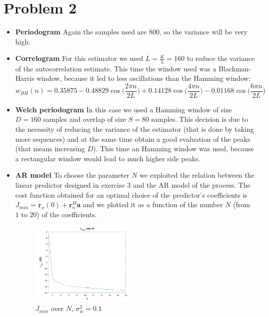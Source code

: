\documentclass[a4paper, 12pt]{report}
\begin{document}
\section*{Problem 2}
\begin{itemize}
	
	\item {\bf Periodogram} Again the samples used are 800, so the variance will be very high.
	
	\item {\bf Correlogram}  For this estimator we used $L=\frac{K}{5}=160$ to reduce the variance of the autocorrelation estimate. This time the window used was a Blackman-Harris window, because it led to less oscillations than the Hamming window:
	\begin{equation}
	w_{BH}(n)=0.35875-0.48829\cos \Big( \frac{2\pi n}{2L} \Big) +0.14128\cos \Big( \frac{4\pi n}{2L} \Big) - 0.01168 \cos \Big( \frac{6 \pi n}{2L} \Big)
	\end{equation}
	
	\item {\bf Welch periodogram} In this case we used a Hamming window of size $D=160$ samples and overlap of size $S=80$ samples. This decision is due to the necessity of reducing the variance of the estimator (that is done by taking more sequences) and at the same time obtain a good evaluation of the peaks (that means increasing $D$). This time an Hamming window was used, because a rectangular window would lead to much higher side peaks. 
	
	
\item {\bf AR model} To choose the parameter $N$ we exploited the relation between the linear predictor designed in exercise 3 and the AR model of the process. The cost function obtained for an optimal choice of the predictor's coefficients is  $J_{min} = \mathtt{r}_x(0) + \mathbf{r}_n^H \mathbf{a}$ and we plotted it as a function of the number $N$ (from $1$ to $20$) of the coefficients.

\begin{figure}[H]
	\centering
	\includegraphics[width=0.5\textwidth]{choiceofn_ex2}
	\caption{$J_{min}$ over $N$, $\sigma_w^2 = 0.1$}
	\label{fig:choiceofn_ex2}
\end{figure}


\end{itemize}
\end{document}
